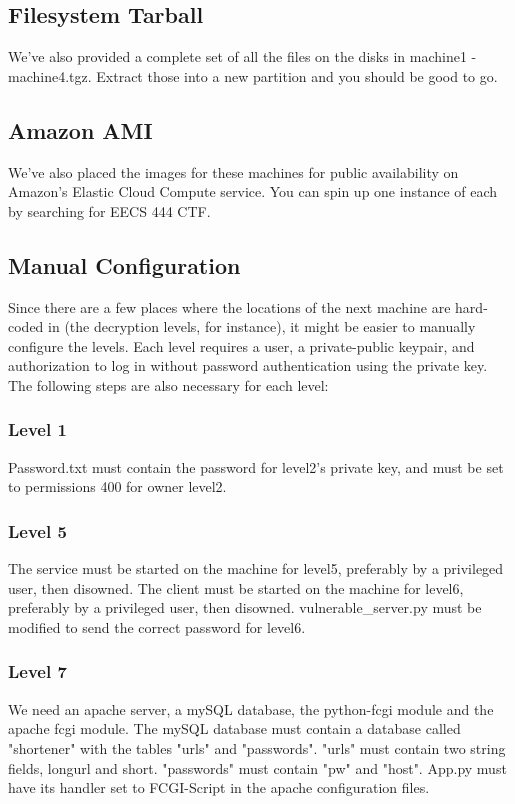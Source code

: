 \documentclass[12pt]{article}
\begin{document}
\subsection{Filesystem Tarball}
We've also provided a complete set of all the files on the disks in machine1 - machine4.tgz.  Extract those into a new partition and you should be good to go.
\subsection{Amazon AMI}
We've also placed the images for these machines for public availability on Amazon's Elastic Cloud Compute service.  You can spin up one instance of each by searching for EECS 444 CTF.
\subsection{Manual Configuration}
Since there are a few places where the locations of the next machine are hard-coded in (the decryption levels, for instance), it might be easier to manually configure the levels.  Each level requires a user, a private-public keypair, and authorization to log in without password authentication using the private key.  The following steps are also necessary for each level:
\subsubsection{Level 1}
Password.txt must contain the password for level2's private key, and must be set to permissions 400 for owner level2.
\subsubsection{Level 5}
The service must be started on the machine for level5, preferably by a privileged user, then disowned.  The client must be started on the machine for level6, preferably by a privileged user, then disowned.  vulnerable\_server.py must be modified to send the correct password for level6.
\subsubsection{Level 7}
We need an apache server, a mySQL database, the python-fcgi module and the apache fcgi module.  The mySQL database must contain a database called "shortener" with the tables "urls" and "passwords".  "urls" must contain two string fields, longurl and short.  "passwords" must contain "pw" and "host".  App.py must have its handler set to FCGI-Script in the apache configuration files.
\end{document}
